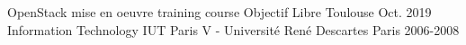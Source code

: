

\begin{cventries}

  \cventry
    {OpenStack mise en oeuvre training course} %
    {Objectif Libre} %
    {Toulouse} %
    {Oct. 2019} %
    {}
  \cventry
    {Information Technology}
    {IUT Paris V - Université René Descartes}
    {Paris}
    {2006-2008}
    {}

    

\end{cventries}
